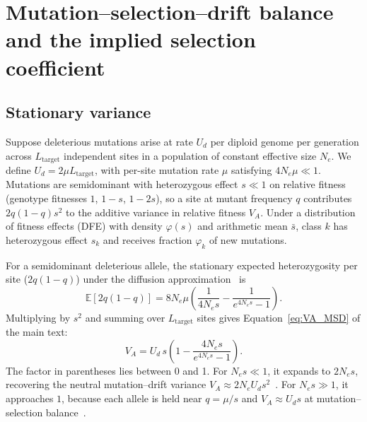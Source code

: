 \documentclass{article}
\begin{document}
    \linenumbers
    \appendix
\fi

\section{Mutation--selection--drift balance and the implied selection coefficient}\label{app:msdbapp}

\subsection{Stationary variance}\label{app:A_stationary}
Suppose deleterious mutations arise at rate $U_d$ per diploid genome per generation across $L_\text{target}$ independent sites in a population of constant effective size $N_e$. We define $U_d = 2\mu L_\text{target}$, with per-site mutation rate $\mu$ satisfying $4N_e\mu \ll 1$. Mutations are semidominant with heterozygous effect $s \ll 1$ on relative fitness (genotype fitnesses $1$, $1-s$, $1-2s$), so a site at mutant frequency $q$ contributes $2q(1-q)s^2$ to the additive variance in relative fitness $V_A$. Under a distribution of fitness effects (DFE) with density $\varphi(s)$ and arithmetic mean $\bar{s}$, class $k$ has heterozygous effect $s_k$ and receives fraction $\varphi_k$ of new mutations.

For a semidominant deleterious allele, the stationary expected heterozygosity per site ($2q(1-q)$) under the diffusion approximation~\cite{kimura1969} is
\begin{equation}
    \mathbb{E}[2q(1-q)] = 8N_e\mu\left(\frac{1}{4N_e s} - \frac{1}{e^{4N_e s} - 1}\right).
\end{equation}
Multiplying by $s^2$ and summing over $L_\text{target}$ sites gives Equation~\eqref{eq:VA_MSD} of the main text:
\begin{equation}
    V_A = U_d\,s\left(1 - \frac{4N_e s}{e^{4N_e s} - 1}\right). \label{eq:A_VA_MSD}
\end{equation}
The factor in parentheses lies between 0 and 1. For $N_e s \ll 1$, it expands to $2N_e s$, recovering the neutral mutation--drift variance $V_A \approx 2N_e U_d s^2$~\cite{lynch1986}. For $N_e s \gg 1$, it approaches $1$, because each allele is held near $q = \mu/s$ and $V_A \approx U_d s$ at mutation--selection balance~\cite{mukai1972,charlesworth2012}.
\end{document}
